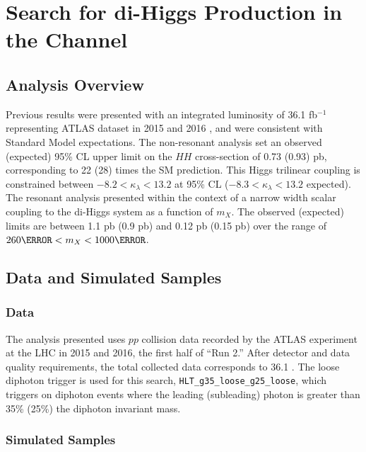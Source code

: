 


\chapter{Search for di-Higgs Production in the Channel} %

\section{Analysis Overview}

Previous results were presented with an integrated luminosity of 36.1 fb$^{-1}$ representing ATLAS dataset in 2015 and 2016 \cite{HIGG-2016-15}, and were consistent with Standard Model expectations. The non-resonant analysis set an observed (expected) 95\% CL upper limit on the $HH$ cross-section of 0.73 (0.93) pb, corresponding to 22 (28) times the SM prediction. This Higgs trilinear coupling is constrained between $-8.2 < \kappa_\lambda < 13.2$ at 95\% CL ($-8.3 < \kappa_\lambda < 13.2$ expected). The resonant analysis presented within the context of a narrow width scalar coupling to the di-Higgs system as a function of $m_X$. The observed (expected) limits are between 1.1 pb (0.9 pb) and 0.12 pb (0.15 pb) over the range of $\unit{260}{\GeV} < m_X < \unit{1000}{\GeV}$.

\section{Data and Simulated Samples}


\subsection{Data}

The analysis presented uses $pp$ collision data recorded by the ATLAS experiment at the LHC in 2015 and 2016, the first half of ``Run 2.'' After detector and data quality requirements, the total collected data corresponds to 36.1 \ifb. The loose diphoton trigger is used for this search, \texttt{HLT\_g35\_loose\_g25\_loose}, which triggers on diphoton events where the leading (subleading) photon \pt is greater than 35\% (25\%) the diphoton invariant mass.

\subsection{Simulated Samples}

